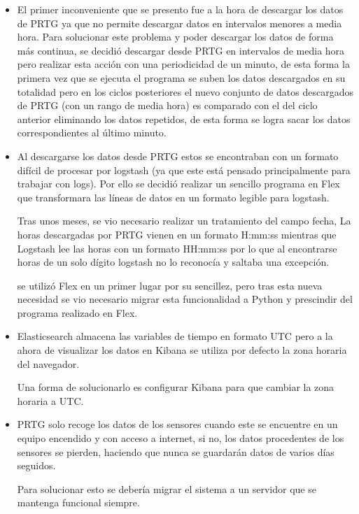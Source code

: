 \begin{itemize}
    \item El primer inconveniente que se presento fue a la hora de descargar los datos de PRTG ya que no permite descargar datos en intervalos menores a media hora. Para solucionar este problema y poder descargar los datos de forma más continua, se decidió descargar desde PRTG en intervalos de media hora pero realizar esta acción con una periodicidad de un minuto, de esta forma la primera vez que se ejecuta el programa se suben los datos descargados en su totalidad pero en los ciclos posteriores el nuevo conjunto de datos descargados de PRTG (con un rango de media hora) es comparado con el del ciclo anterior eliminando los datos repetidos, de esta forma se logra sacar los datos correspondientes al último minuto.
    
    
    \item Al descargarse los datos desde PRTG estos se encontraban con un formato difícil de procesar por logstash (ya que este está pensado principalmente para trabajar con logs). Por ello se decidió realizar un sencillo programa en Flex que transformara las líneas de datos en un formato legible para logstash.
    
    Tras unos meses, se vio necesario realizar un tratamiento del campo fecha, La horas descargadas por PRTG vienen en un formato H:mm:ss mientras que Logstash lee las horas con un formato HH:mm:ss por lo que al encontrarse horas de un solo dígito logstash no lo reconocía y saltaba una excepción.
    
    se utilizó Flex en un primer lugar por su sencillez, pero tras esta nueva necesidad se vio necesario migrar esta funcionalidad a Python y prescindir del programa realizado en Flex.
    
    \item Elasticsearch almacena las variables de tiempo en formato UTC pero a la ahora de visualizar los datos en Kibana se utiliza por defecto la zona horaria del navegador.
    
    Una forma de solucionarlo es configurar Kibana para que cambiar la zona horaria a UTC.
    
    \item PRTG solo recoge los datos de los sensores cuando este se encuentre en un equipo encendido y con acceso a internet, si no, los datos procedentes de los sensores se pierden, haciendo que nunca se guardarán datos de varios días seguidos.
    
    Para solucionar esto se debería migrar el sistema a un servidor que se mantenga funcional siempre.
\end{itemize}
